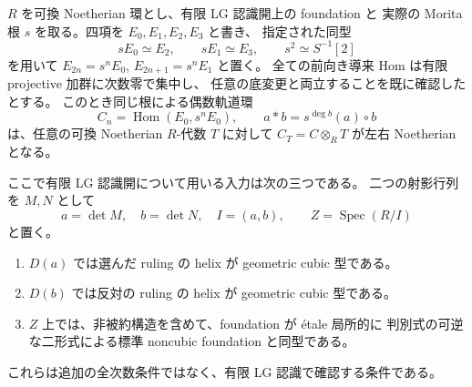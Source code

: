 \begin{lemma}
\label{lem:lg-two-rulings-universal-noetherian}
$R$ を可換 Noetherian 環とし、有限 LG 認識開上の foundation と
実際の Morita 根 $s$ を取る。四項を $E_0,E_1,E_2,E_3$ と書き、
指定された同型
\[
 sE_0\simeq E_2,\qquad sE_1\simeq E_3,
 \qquad s^2\simeq S^{-1}[2]
\]
を用いて $E_{2n}=s^nE_0$, $E_{2n+1}=s^nE_1$ と置く。
全ての前向き導来 Hom は有限 projective 加群に次数零で集中し、
任意の底変更と両立することを既に確認したとする。
このとき同じ根による偶数軌道環
\[
 C_n=\operatorname{Hom}(E_0,s^nE_0),\qquad
 a*b=s^{\deg b}(a)\circ b
\]
は、任意の可換 Noetherian $R$-代数 $T$ に対して
$C_T=C\otimes_RT$ が左右 Noetherian となる。

ここで有限 LG 認識開について用いる入力は次の三つである。
二つの射影行列を $M,N$ として
\[
 a=\det M,\quad b=\det N,\quad I=(a,b),
 \qquad Z=\operatorname{Spec}(R/I)
\]
と置く。
\begin{enumerate}
\item $D(a)$ では選んだ ruling の helix が geometric cubic 型である。
\item $D(b)$ では反対の ruling の helix が geometric cubic 型である。
\item $Z$ 上では、非被約構造を含めて、foundation が \'etale 局所的に
  判別式の可逆な二形式による標準 noncubic foundation と同型である。
\end{enumerate}
これらは追加の全次数条件ではなく、有限 LG 認識で確認する条件である。
\end{lemma}

